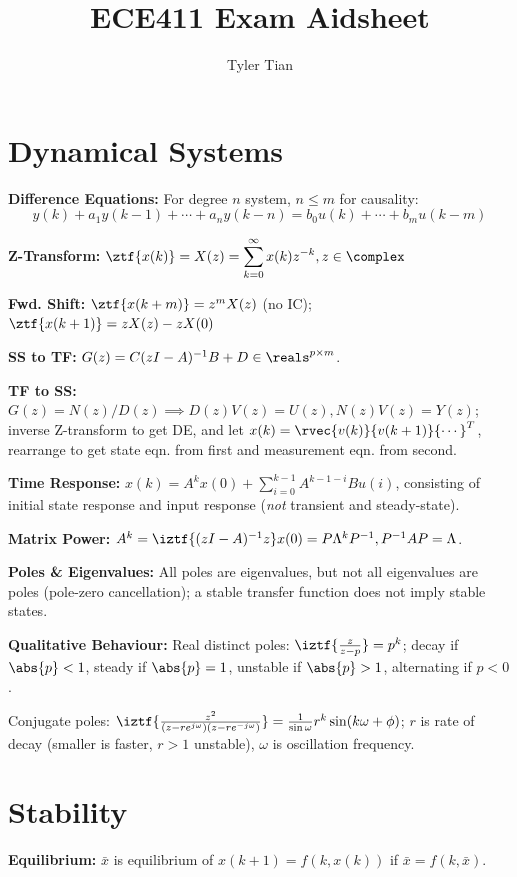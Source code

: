 \documentclass[twocolumn, 8pt]{extarticle}
\title{ECE411 Exam Aidsheet}
\author{Tyler Tian}
\begin{document}
\section{Dynamical Systems} %

\textbf{Difference Equations:} For degree \(n\) system, \(n \leq m\) for causality:
\[y(k) + a_1y(k - 1) + \cdots + a_ny(k - n) = b_0u(k) + \cdots + b_mu(k - m)\]

\textbf{Z-Transform:} \(\displaystyle \ztf{x(k)} = X(z) = \sum _{k = 0}^\infty x(k)z^{-k}, z \in \complex\)

\textbf{Fwd. Shift:} \(\ztf{x(k + m)} = z^mX(z)\) (no IC); \(\ztf{x(k + 1)} = zX(z) - zX(0)\)

\textbf{SS to TF:} \(G(z) = C(zI - A)^{-1}B + D \in \reals^{p \times m}\).

\textbf{TF to SS:} \(G(z) = N(z)/D(z) \implies D(z)V(z) = U(z), N(z)V(z) = Y(z)\); inverse Z-transform to get DE, and
let \(x(k) = \rvec{v(k)}{v(k + 1)}{\cdots}^T\), rearrange to get state eqn. from first and measurement eqn. from second.

\textbf{Time Response:} \(\displaystyle x(k) = A^kx(0) + \sum _{i = 0}^{k - 1}A^{k - 1 - i}Bu(i)\), consisting of
initial state response and input response (\emph{not} transient and steady-state).

\textbf{Matrix Power:} \(A^k = \iztf{(zI - A)^{-1}z}x(0) = P\Lambda^kP^{-1}, P^{-1}AP = \Lambda\).

\textbf{Poles \& Eigenvalues:} All poles are eigenvalues, but not all eigenvalues are poles (pole-zero cancellation);
a stable transfer function does not imply stable states.

\textbf{Qualitative Behaviour:} Real distinct poles: \(\iztf{\frac{z}{z - p}} = p^k\); decay if \(\abs{p} < 1\), steady
if \(\abs{p} = 1\), unstable if \(\abs{p} > 1\), alternating if \(p < 0\).

Conjugate poles: \(\iztf{\frac{z^2}{(z - re^{j\omega})(z - re^{-j\omega})}} = \frac{1}{\sin\omega}r^k\sin(k\omega + \phi)\);
\(r\) is rate of decay (smaller is faster, \(r > 1\) unstable), \(\omega\) is oscillation frequency.

\section{Stability} %

\textbf{Equilibrium:} \(\bar x\) is equilibrium of \(x(k + 1) = f(k, x(k))\) if \(\bar x = f(k, \bar x)\).
\end{document}
